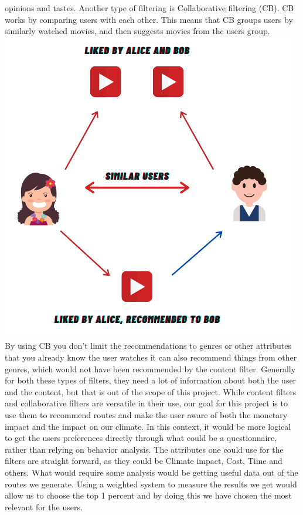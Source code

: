 opinions and tastes. \vspace{5mm}
Another type of filtering is Collaborative filtering (CB).
CB works by comparing users with each other.
This means that CB groups users by similarly watched movies, and then suggests movies from the users group.\newline
\includegraphics[]{images/collaborative-filtering} \newline
By using CB you don't limit the recommendations to genres or other attributes that you already know the user watches it
can also recommend things from other genres, which would not have been recommended by the content filter.\newline
Generally for both these types of filters, they need a lot of information about both the user and the content, but that
is out of the scope of this project.\newline
\vspace{5mm}
While content filters and collaborative filters are versatile in their use, our goal for this project is to use them to
recommend routes and make the user aware of both the monetary impact and the impact on our climate.
In this context, it would be more logical to get the users preferences directly through what could be a questionnaire,
rather than relying on behavior analysis.
The attributes one could use for the filters are straight forward, as they could be Climate impact, Cost, Time and
others.
What would require some analysis would be getting useful data out of the routes we generate.
Using a weighted system to measure the results we get would allow us to choose the top 1 percent
and by doing this we have chosen the most relevant for the users.\newline
